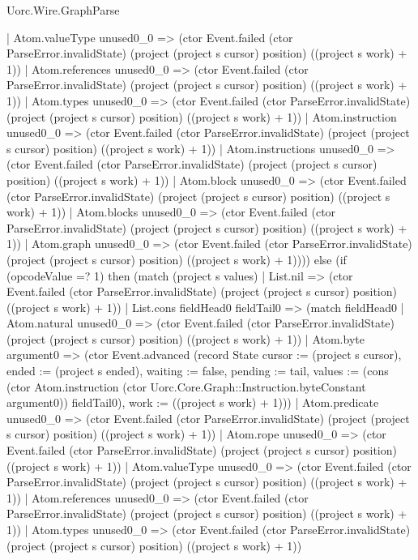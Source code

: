 \begin{lexlean}{Uorc.Wire.GraphParse}
\begin{semanticmodule}
{          | Atom.valueType unused0_0 => (ctor Event.failed (ctor ParseError.invalidState) (project (project s cursor) position) ((project s work) + 1))
          | Atom.references unused0_0 => (ctor Event.failed (ctor ParseError.invalidState) (project (project s cursor) position) ((project s work) + 1))
          | Atom.types unused0_0 => (ctor Event.failed (ctor ParseError.invalidState) (project (project s cursor) position) ((project s work) + 1))
          | Atom.instruction unused0_0 => (ctor Event.failed (ctor ParseError.invalidState) (project (project s cursor) position) ((project s work) + 1))
          | Atom.instructions unused0_0 => (ctor Event.failed (ctor ParseError.invalidState) (project (project s cursor) position) ((project s work) + 1))
          | Atom.block unused0_0 => (ctor Event.failed (ctor ParseError.invalidState) (project (project s cursor) position) ((project s work) + 1))
          | Atom.blocks unused0_0 => (ctor Event.failed (ctor ParseError.invalidState) (project (project s cursor) position) ((project s work) + 1))
          | Atom.graph unused0_0 => (ctor Event.failed (ctor ParseError.invalidState) (project (project s cursor) position) ((project s work) + 1)))) else (if (opcodeValue =? 1) then (match (project s values)
        | List.nil => (ctor Event.failed (ctor ParseError.invalidState) (project (project s cursor) position) ((project s work) + 1))
        | List.cons fieldHead0 fieldTail0 => (match fieldHead0
          | Atom.natural unused0_0 => (ctor Event.failed (ctor ParseError.invalidState) (project (project s cursor) position) ((project s work) + 1))
          | Atom.byte argument0 => (ctor Event.advanced (record State {cursor := (project s cursor), ended := (project s ended), waiting := false, pending := tail, values := (cons (ctor Atom.instruction (ctor Uorc.Core.Graph::Instruction.byteConstant argument0)) fieldTail0), work := ((project s work) + 1)}))
          | Atom.predicate unused0_0 => (ctor Event.failed (ctor ParseError.invalidState) (project (project s cursor) position) ((project s work) + 1))
          | Atom.rope unused0_0 => (ctor Event.failed (ctor ParseError.invalidState) (project (project s cursor) position) ((project s work) + 1))
          | Atom.valueType unused0_0 => (ctor Event.failed (ctor ParseError.invalidState) (project (project s cursor) position) ((project s work) + 1))
          | Atom.references unused0_0 => (ctor Event.failed (ctor ParseError.invalidState) (project (project s cursor) position) ((project s work) + 1))
          | Atom.types unused0_0 => (ctor Event.failed (ctor ParseError.invalidState) (project (project s cursor) position) ((project s work) + 1))
}
\end{semanticmodule}
\end{lexlean}
